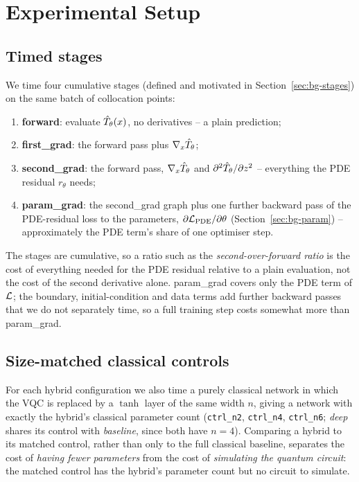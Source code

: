 \section{Experimental Setup}
\label{sec:setup}

\subsection{Timed stages}
We time four cumulative stages (defined and motivated in Section~\ref{sec:bg-stages}) on the same batch of
collocation points:
\begin{enumerate}
  \item \textbf{forward}: evaluate $\hat T_\theta(x)$, no derivatives -- a plain prediction;
  \item \textbf{first\_grad}: the forward pass plus $\nabla_x\hat T_\theta$;
  \item \textbf{second\_grad}: the forward pass, $\nabla_x\hat T_\theta$ and $\partial^2\hat T_\theta/\partial z^2$ -- everything
  the PDE residual $r_\theta$ needs;
  \item \textbf{param\_grad}: the second\_grad graph plus one further backward pass of the PDE-residual loss
  to the parameters, $\partial\mathcal{L}_{\text{PDE}}/\partial\theta$ (Section~\ref{sec:bg-param}) -- approximately
  the PDE term's share of one optimiser step.
\end{enumerate}
The stages are cumulative, so a ratio such as the \emph{second-over-forward ratio} is the cost of everything
needed for the PDE residual relative to a plain evaluation, not the cost of the second derivative alone.
param\_grad covers only the PDE term of $\mathcal{L}$; the boundary, initial-condition and data terms add further
backward passes that we do not separately time, so a full training step costs somewhat more than param\_grad.

\subsection{Size-matched classical controls}
\label{sec:setup-controls}
For each hybrid configuration we also time a purely classical network in which the VQC is replaced by a
$\tanh$ layer of the same width $n$, giving a network with exactly the hybrid's classical parameter count
(\texttt{ctrl\_n2}, \texttt{ctrl\_n4}, \texttt{ctrl\_n6}; \emph{deep} shares its control with \emph{baseline},
since both have $n=4$). Comparing a hybrid to its matched control, rather than only to the full classical
baseline, separates the cost of \emph{having fewer parameters} from the cost of \emph{simulating the quantum
circuit}: the matched control has the hybrid's parameter count but no circuit to simulate.

